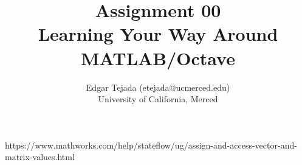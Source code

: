 \documentclass [12pt]{article}
\title{Assignment 00 \\\medskip Learning Your Way Around MATLAB/Octave}
\author{Edgar Tejada (etejada@ucmerced.edu)\\University of California, Merced}
\begin{document}
\maketitle


https://www.mathworks.com/help/stateflow/ug/assign-and-access-vector-and-matrix-values.html

\nocite{*} %
\printbibliography
\end{document}

